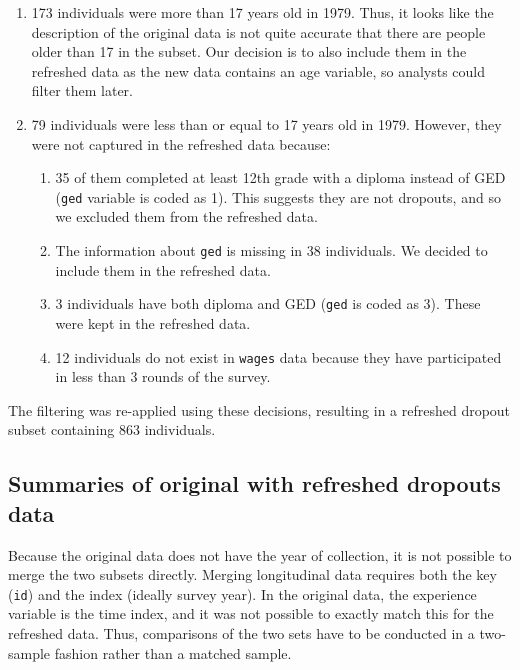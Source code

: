 \documentclass[12pt]{article}
\providecommand{\tightlist}{%
  \setlength{\itemsep}{0pt}\setlength{\parskip}{0pt}}
\begin{document}
\begin{enumerate}
\def\labelenumi{\arabic{enumi}.}
\tightlist
\item
  173 individuals were more than 17 years old in 1979. Thus, it looks like the description of the original data is not quite accurate that there are people older than 17 in the subset. Our decision is to also include them in the refreshed data as the new data contains an age variable, so analysts could filter them later.
\item
  79 individuals were less than or equal to 17 years old in 1979. However, they were not captured in the refreshed data because:

  \begin{enumerate}
  \def\labelenumii{\roman{enumii}.}
  \tightlist
  \item
    35 of them completed at least 12th grade with a diploma instead of GED (\texttt{ged} variable is coded as 1). This suggests they are not dropouts, and so we excluded them from the refreshed data.
  \item
    The information about \texttt{ged} is missing in 38 individuals. We decided to include them in the refreshed data.
  \item
    3 individuals have both diploma and GED (\texttt{ged} is coded as 3). These were kept in the refreshed data.
  \item
    12 individuals do not exist in \texttt{wages} data because they have participated in less than 3 rounds of the survey.
  \end{enumerate}
\end{enumerate}

The filtering was re-applied using these decisions, resulting in a refreshed dropout subset containing 863 individuals.

\hypertarget{summaries-of-original-with-refreshed-dropouts-data}{%
\subsection{Summaries of original with refreshed dropouts data}\label{summaries-of-original-with-refreshed-dropouts-data}}

Because the original data does not have the year of collection, it is not possible to merge the two subsets directly. Merging longitudinal data requires both the key (\texttt{id}) and the index (ideally survey year). In the original data, the experience variable is the time index, and it was not possible to exactly match this for the refreshed data. Thus, comparisons of the two sets have to be conducted in a two-sample fashion rather than a matched sample.
\end{document}
